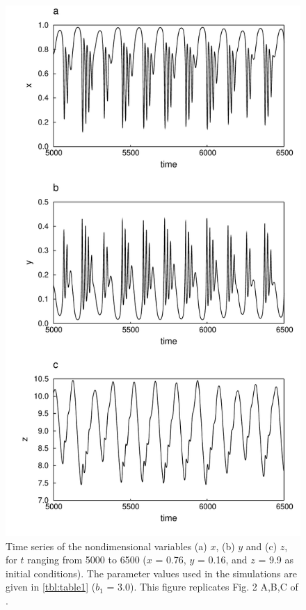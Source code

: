 \begin{figure}
  \centering
  \includegraphics[scale=0.7]{figures/fig2.pdf} \caption{Time series of the nondimensional variables (a) $x$, (b) $y$ and (c) $z$, for $t$ ranging from 5000 to 6500 ($x$ = 0.76, $y$ = 0.16, and $z$ = 9.9 as initial conditions). The parameter values used in the simulations are given in \autoref{tbl:table1} ($b_1$ = 3.0). This figure replicates Fig. 2 A,B,C of \citet{hastings1991}.}
  \label{fig:fig2}
\end{figure}


